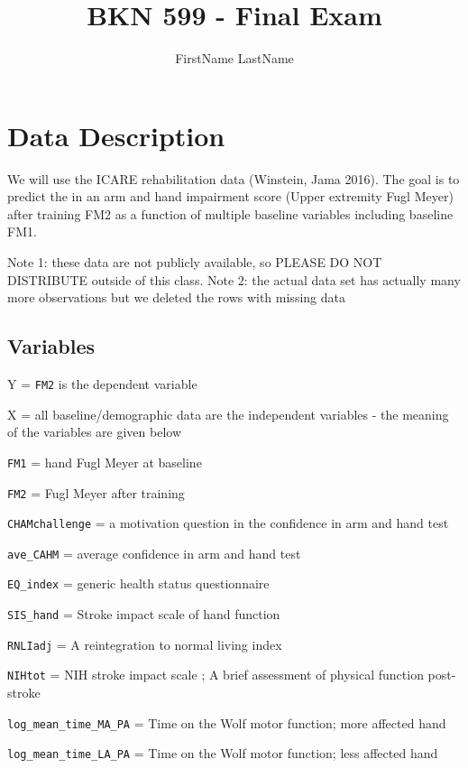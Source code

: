 \documentclass[
]{article}
\title{BKN 599 - Final Exam}
\author{FirstName LastName}
\date{}
\begin{document}
\maketitle

\hypertarget{data-description}{%
\section{Data Description}\label{data-description}}

We will use the ICARE rehabilitation data (Winstein, Jama 2016). The
goal is to predict the in an arm and hand impairment score (Upper
extremity Fugl Meyer) after training FM2 as a function of multiple
baseline variables including baseline FM1.

Note 1: these data are not publicly available, so PLEASE DO NOT
DISTRIBUTE outside of this class. Note 2: the actual data set has
actually many more observations but we deleted the rows with missing
data

\hypertarget{variables}{%
\subsection{Variables}\label{variables}}

Y = \texttt{FM2} is the dependent variable

X = all baseline/demographic data are the independent variables - the
meaning of the variables are given below

\texttt{FM1} = hand Fugl Meyer at baseline

\texttt{FM2} = Fugl Meyer after training

\texttt{CHAMchallenge} = a motivation question in the confidence in arm
and hand test

\texttt{ave\_CAHM} = average confidence in arm and hand test

\texttt{EQ\_index} = generic health status questionnaire

\texttt{SIS\_hand} = Stroke impact scale of hand function

\texttt{RNLIadj} = A reintegration to normal living index

\texttt{NIHtot} = NIH stroke impact scale ; A brief assessment of
physical function post-stroke

\texttt{log\_mean\_time\_MA\_PA} = Time on the Wolf motor function; more
affected hand

\texttt{log\_mean\_time\_LA\_PA} = Time on the Wolf motor function; less
affected hand
\end{document}
